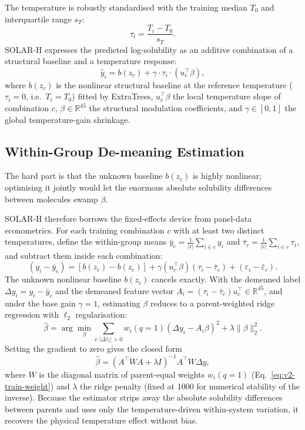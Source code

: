 The temperature is robustly standardised with the training median $T_0$ and interquartile range $s_T$:
\begin{equation}
\tau_i = \frac{T_i - T_0}{s_T}.
\end{equation}
SOLAR-H expresses the predicted log-solubility as an additive combination of a structural baseline and a temperature response:
\begin{equation}\label{eq:v2-solar}
\widehat y_i = b(z_c) + \gamma \cdot \tau_i \cdot \left( u_c^\top \beta \right),
\end{equation}
where $b(z_c)$ is the nonlinear structural baseline at the reference temperature ($\tau_i = 0$, i.e.\ $T_i = T_0$) fitted by ExtraTrees, $u_c^\top \beta$ the local temperature slope of combination $c$, $\beta \in \mathbb{R}^{45}$ the structural modulation coefficients, and $\gamma \in [0, 1]$ the global temperature-gain shrinkage.

\subsection{Within-Group De-meaning Estimation}

The hard part is that the unknown baseline $b(z_c)$ is highly nonlinear; optimising it jointly would let the enormous absolute solubility differences between molecules swamp $\beta$.

SOLAR-H therefore borrows the fixed-effects device from panel-data econometrics. For each training combination $c$ with at least two distinct temperatures, define the within-group means $\bar y_c = \frac{1}{|c|}\sum_{i \in c} y_i$ and $\bar\tau_c = \frac{1}{|c|}\sum_{i \in c} \tau_i$, and subtract them inside each combination:
\begin{equation}
(y_i - \bar y_c) = \left[ b(z_c) - b(z_c) \right] + \gamma (u_c^\top \beta) (\tau_i - \bar\tau_c) + (\varepsilon_i - \bar\varepsilon_c).
\end{equation}
The unknown nonlinear baseline $b(z_c)$ cancels exactly. With the demeaned label $\Delta y_i = y_i - \bar y_c$ and the demeaned feature vector $A_i = (\tau_i - \bar\tau_c) u_c^\top \in \mathbb{R}^{45}$, and under the base gain $\gamma = 1$, estimating $\beta$ reduces to a parent-weighted ridge regression with $\ell_2$ regularisation:
\begin{equation}
\widehat\beta = \arg\min_\beta \sum_{i: |\Delta\tau_i| > 0} w_i(q=1) (\Delta y_i - A_i \beta)^2 + \lambda \|\beta\|_2^2.
\end{equation}
Setting the gradient to zero gives the closed form
\begin{equation}
\widehat\beta = (A^\top W A + \lambda I)^{-1} A^\top W \Delta y,
\end{equation}
where $W$ is the diagonal matrix of parent-equal weights $w_i(q=1)$ (Eq.~\eqref{eq:v2-train-weight}) and $\lambda$ the ridge penalty (fixed at 1000 for numerical stability of the inverse). Because the estimator strips away the absolute solubility differences between parents and uses only the temperature-driven within-system variation, it recovers the physical temperature effect without bias.

